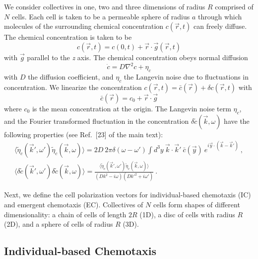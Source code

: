 We consider collectives in one, two and three dimensions of radius $R$ comprised of $N$ cells. Each cell is taken to be a permeable sphere of radius $a$ through which molecules of the surrounding chemical concentration $c(\vec{r},t)$ can freely diffuse. The chemical concentration is taken to be
\begin{equation}
    c(\vec{r},t) = c(0,t) + \vec{r}\cdot\vec{g}(\vec{r},t)
\end{equation}
with $\vec{g}$ parallel to the \textit{z} axis. The chemical concentration obeys normal diffusion
\begin{equation} \label{eq:diffeq}
    \dot{c} = D\nabla^2c+\eta_c
\end{equation}
with $D$ the diffusion coefficient, and $\eta_c$ the Langevin noise due to fluctuations in concentration. We linearize the concentration $c(\vec{r},t) = \bar{c}(\vec{r}) + \delta c(\vec{r},t)$ with
\begin{equation} \label{eq:meanc}
    \bar{c}(\vec{r}) = c_0 + \vec{r}\cdot\vec{g}
\end{equation}
where $c_0$ is the mean concentration at the origin. The Langevin noise term $\eta_c$, and the Fourier transformed fluctuation in the concentration $\delta\tilde{c}(\vec{k},\omega)$ have the following properties (see Ref.\ [23] of the main text):
\begin{gather}
    \langle\tilde{\eta}_c(\vec{k}',\omega')\tilde{\eta}_c(\vec{k},\omega) \rangle = 2D \ 2\pi\delta(\omega-\omega') \int d^3y \ \vec{k}\cdot\vec{k}' \ \bar{c}(\vec{y}) \ e^{i\vec{y}\cdot\left(\vec{k}-\vec{k}'\right)} \ ,
    \label{eq:c1} \\
    \langle\delta\tilde{c}(\vec{k}',\omega')\delta\tilde{c}(\vec{k},\omega) \rangle = \frac{\langle\tilde{\eta}_c(\vec{k}',\omega')\tilde{\eta}_c(\vec{k},\omega) \rangle}{(Dk^2-i\omega)(Dk'^2+i\omega')} \ .
    \label{eq:c2}
\end{gather}

Next, we define the cell polarization vectors for individual-based chemotaxis (IC) and emergent chemotaxis (EC). Collectives of $N$ cells form shapes of different dimensionality: a chain of cells of length $2R$ (1D), a disc of cells with radius $R$ (2D), and a sphere of cells of radius $R$ (3D).


\subsection{Individual-based Chemotaxis}

